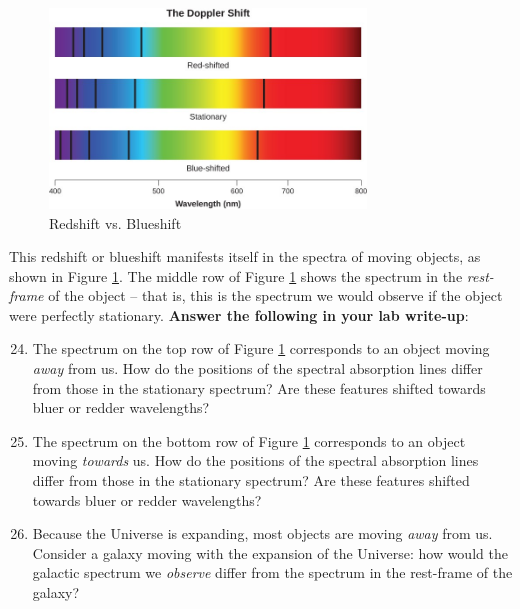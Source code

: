 \documentclass[11pt]{article}
\begin{document}
\begin{figure}[h!]
    \centering
    \includegraphics[width=0.75\textwidth]{Images/redshift.jpg}
    \caption{Redshift vs. Blueshift}
    \label{fig:redshift}
\end{figure}

\medskip \noindent
This redshift or blueshift manifests itself in the spectra of moving objects, as shown in Figure \ref{fig:redshift}. The middle row of Figure \ref{fig:redshift} shows the spectrum in the \emph{rest-frame} of the object -- that is, this is the spectrum we would observe if the object were perfectly stationary. \textbf{Answer the following in your lab write-up}:

\begin{enumerate}
    \setcounter{enumi}{23}
    
    \item The spectrum on the top row of Figure \ref{fig:redshift} corresponds to an object moving \emph{away} from us. How do the positions of the spectral absorption lines differ from those in the stationary spectrum? Are these features shifted towards bluer or redder wavelengths?
    
    \item The spectrum on the bottom row of Figure \ref{fig:redshift} corresponds to an object moving \emph{towards} us. How do the positions of the spectral absorption lines differ from those in the stationary spectrum? Are these features shifted towards bluer or redder wavelengths?
    
    \item Because the Universe is expanding, most objects are moving \emph{away} from us. Consider a galaxy moving with the expansion of the Universe: how would the galactic spectrum we \emph{observe} differ from the spectrum in the rest-frame of the galaxy? 
\end{enumerate}
\end{document}
